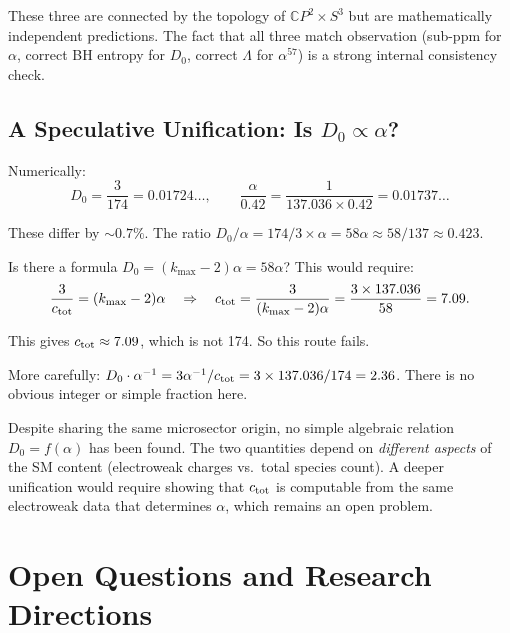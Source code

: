\documentclass[11pt,a4paper]{article}
\begin{document}
These three are connected by the topology of $\mathbb{C}P^2 \times S^3$ but are mathematically independent predictions. The fact that all three match observation (sub-ppm for $\alpha$, correct BH entropy for $D_0$, correct $\Lambda$ for $\alpha^{57}$) is a strong internal consistency check.

\subsection{A Speculative Unification: Is $D_0 \propto \alpha$?}

Numerically:
\begin{equation}
D_0 = \frac{3}{174} = 0.01724\ldots, \qquad \frac{\alpha}{0.42} = \frac{1}{137.036 \times 0.42} = 0.01737\ldots
\end{equation}

These differ by $\sim 0.7\%$. The ratio $D_0/\alpha = 174/3 \times \alpha = 58\alpha \approx 58/137 \approx 0.423$.

Is there a formula $D_0 = (k_{\max} - 2)\alpha = 58\alpha$? This would require:
\begin{equation}
\frac{3}{c_{\rm tot}} = (k_{\max} - 2)\alpha \quad\Rightarrow\quad c_{\rm tot} = \frac{3}{(k_{\max}-2)\alpha} = \frac{3 \times 137.036}{58} = 7.09.
\end{equation}

This gives $c_{\rm tot} \approx 7.09$, which is not 174. So this route fails.

More carefully: $D_0 \cdot \alpha^{-1} = 3\alpha^{-1}/c_{\rm tot} = 3 \times 137.036/174 = 2.36$. There is no obvious integer or simple fraction here.

\begin{tcolorbox}[colback=red!5!white, colframe=red!50!black, title=Conclusion: No Simple $D_0$--$\alpha$ Formula]
Despite sharing the same microsector origin, no simple algebraic relation $D_0 = f(\alpha)$ has been found. The two quantities depend on \emph{different aspects} of the SM content (electroweak charges vs.\ total species count). A deeper unification would require showing that $c_{\rm tot}$ is computable from the same electroweak data that determines $\alpha$, which remains an open problem.
\end{tcolorbox}


\section{Open Questions and Research Directions}
\label{sec:open}
\end{document}
